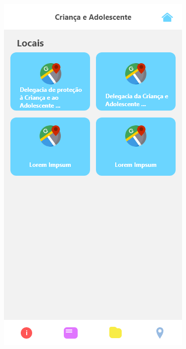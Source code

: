 \documentclass[
	12pt,				%
	openright,			%
	oneside,			%
	a4paper,			%
	english,			%
	brazil,				%
	]{abntex2}
\theoremstyle{theorem}
\theoremstyle{definition}
\begin{document}
\begin{figure}[H]
\begin{minipage}{.3\textwidth}
  \includegraphics[width=.9\linewidth]{imagens/prototipLocais.png}
  \label{fig: Tela locais}
\end{minipage}%
\begin{minipage}{.3\textwidth}
  \centering

\end{minipage}
\end{figure}
\end{document}
